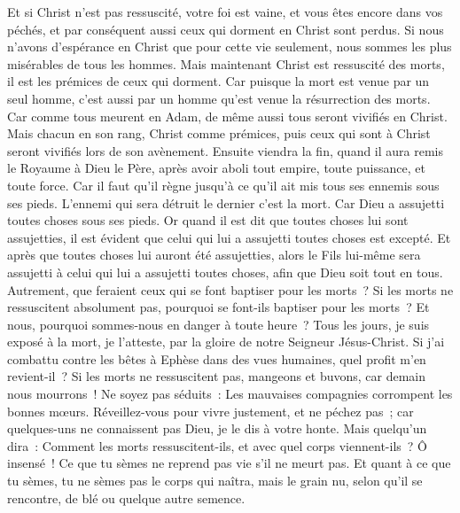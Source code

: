 \begin{multicols}{2}
Et si Christ n'est pas ressuscité, votre foi est vaine, et vous êtes encore dans vos péchés,
et par conséquent aussi ceux qui dorment en Christ sont perdus.
Si nous n'avons d'espérance en Christ que pour cette vie seulement, nous sommes les plus misérables de tous les hommes.
Mais maintenant Christ est ressuscité des morts, il est les prémices de ceux qui dorment.
Car puisque la mort est venue par un seul homme, c'est aussi par un homme qu'est venue la résurrection des morts.
Car comme tous meurent en Adam, de même aussi tous seront vivifiés en Christ.
Mais chacun en son rang, Christ comme prémices, puis ceux qui sont à Christ seront vivifiés lors de son avènement.
Ensuite viendra la fin, quand il aura remis le Royaume à Dieu le Père, après avoir aboli tout empire, toute puissance, et toute force.
Car il faut qu'il règne jusqu'à ce qu'il ait mis tous ses ennemis sous ses pieds.
L'ennemi qui sera détruit le dernier c'est la mort.
Car Dieu a assujetti toutes choses sous ses pieds. Or quand il est dit que toutes choses lui sont assujetties, il est évident que celui qui lui a assujetti toutes choses est excepté.
Et après que toutes choses lui auront été assujetties, alors le Fils lui-même sera assujetti à celui qui lui a assujetti toutes choses, afin que Dieu soit tout en tous.
Autrement, que feraient ceux qui se font baptiser pour les morts~? Si les morts ne ressuscitent absolument pas, pourquoi se font-ils baptiser pour les morts~?
Et nous, pourquoi sommes-nous en danger à toute heure~?
Tous les jours, je suis exposé à la mort, je l'atteste, par la gloire de notre Seigneur Jésus-Christ.
Si j'ai combattu contre les bêtes à Ephèse dans des vues humaines, quel profit m'en revient-il~? Si les morts ne ressuscitent pas, mangeons et buvons, car demain nous mourrons~!
Ne soyez pas séduits~: Les mauvaises compagnies corrompent les bonnes mœurs.
Réveillez-vous pour vivre justement, et ne péchez pas~; car quelques-uns ne connaissent pas Dieu, je le dis à votre honte.
Mais quelqu'un dira~: Comment les morts ressuscitent-ils, et avec quel corps viennent-ils~?
Ô insensé~! Ce que tu sèmes ne reprend pas vie s'il ne meurt pas.
Et quant à ce que tu sèmes, tu ne sèmes pas le corps qui naîtra, mais le grain nu, selon qu'il se rencontre, de blé ou quelque autre semence.

\end{multicols}
